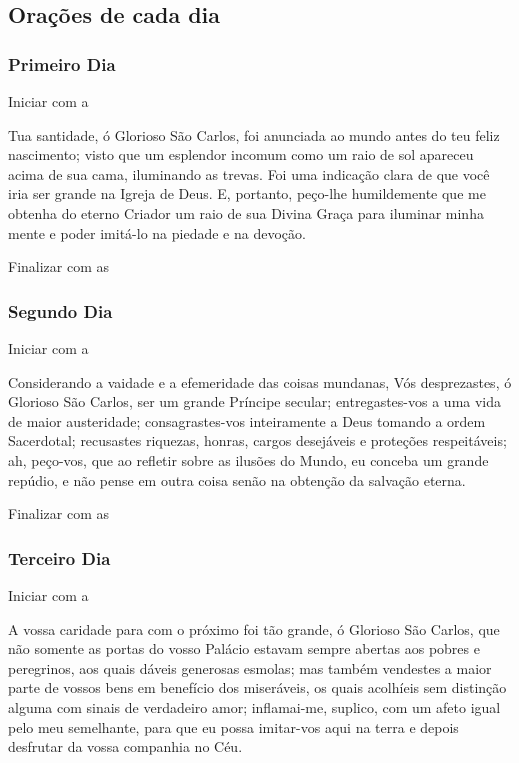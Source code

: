 \documentclass[a4paper,14pt]{extarticle} \usepackage[utf8]{inputenc}
\begin{document}
\subsection{Orações de cada dia}
\subsubsection{Primeiro Dia}
Iniciar com a \textbf{}

Tua santidade, ó Glorioso São Carlos, foi anunciada ao mundo antes do teu feliz nascimento; visto que um esplendor incomum como um raio de sol apareceu acima de sua cama, iluminando as trevas. Foi uma indicação clara de que você iria ser grande na Igreja de Deus. E, portanto, peço-lhe humildemente que me obtenha do eterno Criador um raio de sua Divina Graça para iluminar minha mente e poder imitá-lo na piedade e na devoção.

Finalizar com as \textbf{}

\subsubsection{Segundo Dia}
Iniciar com a \textbf{}

Considerando a vaidade e a efemeridade das coisas mundanas, Vós desprezastes, ó Glorioso São Carlos, ser um grande Príncipe secular; entregastes-vos a uma vida de maior austeridade; consagrastes-vos inteiramente a Deus tomando a ordem Sacerdotal; recusastes riquezas, honras, cargos desejáveis e proteções respeitáveis; ah, peço-vos, que ao refletir sobre as ilusões do Mundo, eu conceba um grande repúdio, e não pense em outra coisa senão na obtenção da salvação eterna.

Finalizar com as \textbf{}

\subsubsection{Terceiro Dia}
Iniciar com a \textbf{}

A vossa caridade para com o próximo foi tão grande, ó Glorioso São Carlos, que não somente as portas do vosso Palácio estavam sempre abertas aos pobres e peregrinos, aos quais dáveis generosas esmolas; mas também vendestes a maior parte de vossos bens em benefício dos miseráveis, os quais acolhíeis sem distinção alguma com sinais de verdadeiro amor; inflamai-me, suplico, com um afeto igual pelo meu semelhante, para que eu possa imitar-vos aqui na terra e depois desfrutar da vossa companhia no Céu.
\end{document}
